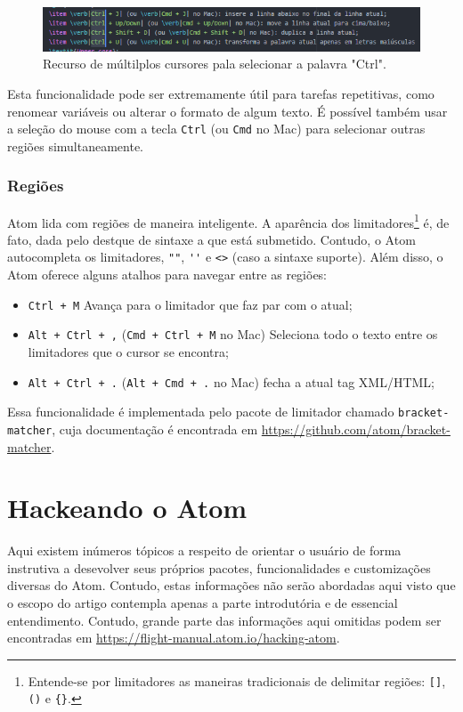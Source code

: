 	\begin{figure}[h]
		\centering
		\label{fig:multcursor}
		\includegraphics[scale = 0.8]{multcursor}
		\caption{Recurso de múltilplos cursores pala selecionar a palavra "Ctrl".}
	\end{figure}

	Esta funcionalidade pode ser extremamente útil para tarefas repetitivas, como renomear variáveis ou alterar o formato de algum texto. É possível também usar a seleção do mouse com a tecla \verb|Ctrl| (ou \verb|Cmd| no Mac) para selecionar outras regiões simultaneamente.

	\subsubsection{Regiões}
	Atom lida com regiões de maneira inteligente. A aparência dos limitadores\footnote{Entende-se por limitadores as maneiras tradicionais de delimitar regiões: \verb*|[]|, \verb*|()| e \verb*|{}|.} é, de fato, dada pelo destque de sintaxe a que está submetido.  Contudo, o Atom autocompleta os limitadores, \verb|""|, \verb|''| e \verb|<>| (caso a sintaxe suporte). Além disso, o Atom oferece alguns atalhos para navegar entre as regiões:
	\begin{itemize}
		\item \verb|Ctrl + M| Avança para o limitador que faz par com o atual;
		\item \verb|Alt + Ctrl + ,| (\verb|Cmd + Ctrl + M| no Mac) Seleciona todo o texto entre os limitadores que o cursor se encontra;
		\item \verb|Alt + Ctrl + .| (\verb|Alt + Cmd + .| no Mac) fecha a atual tag XML/HTML;
	\end{itemize}

	Essa funcionalidade é implementada pelo pacote de limitador chamado \verb|bracket-matcher|, cuja documentação é encontrada em \href{https://github.com/atom/bracket-matcher}{https://github.com/atom/bracket-matcher}.

	\section{Hackeando o Atom}
	Aqui existem inúmeros tópicos a respeito de orientar o usuário de forma instrutiva a desevolver seus próprios pacotes, funcionalidades e customizações diversas do Atom. Contudo, estas informações não serão abordadas aqui visto que o escopo do artigo contempla apenas a parte introdutória e de essencial entendimento. Contudo, grande parte das informações aqui omitidas podem ser encontradas em \href{https://flight-manual.atom.io/hacking-atom}{https://flight-manual.atom.io/hacking-atom}.

